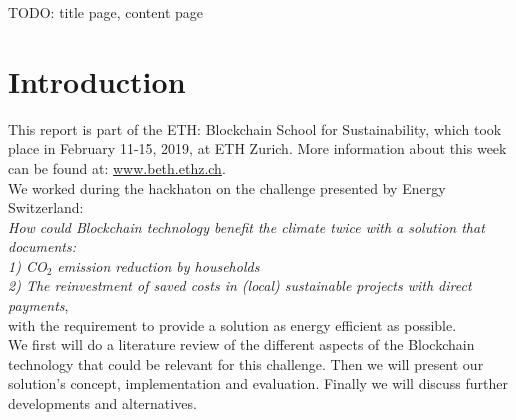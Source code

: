 \documentclass[11pt]{article}
\begin{document}
TODO: title page, content page

\section{Introduction}
This report is part of the ETH: Blockchain School for Sustainability, which took place in February 11-15, 2019, at ETH Zurich. More information about this week can be found at: \hyperref[www.beth.ethz.ch]{www.beth.ethz.ch}.\\
We worked during the hackhaton on the challenge presented by Energy Switzerland:\\ \textit{How could Blockchain technology benefit the climate twice with a solution that documents:\\
1) CO$_2$ emission reduction by households\\
2) The reinvestment of saved costs in (local) sustainable projects with direct payments},\\
with the requirement to provide a solution as energy efficient as possible.\\
We first will do a literature review of the different aspects of the Blockchain technology that could be relevant for this challenge. Then we will present our solution's concept, implementation and evaluation. Finally we will discuss further developments and alternatives.\\
\end{document}
